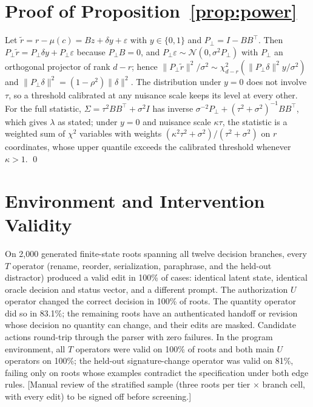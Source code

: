 \documentclass[10pt]{article}
\newcommand{\TBD}[1]{\textcolor{BrickRed}{[#1]}}
\begin{document}



\appendix
\section{Proof of Proposition~\ref{prop:power}}
\label{app:proof}
Let $\tilde r=r-\mu(c)=Bz+\delta y+\varepsilon$ with $y\in\{0,1\}$ and $P_\perp=I-BB^\top$. Then
$P_\perp\tilde r=P_\perp\delta y+P_\perp\varepsilon$ because $P_\perp B=0$, and $P_\perp\varepsilon\sim
\mathcal N(0,\sigma^2P_\perp)$ with $P_\perp$ an orthogonal projector of rank $d-r$; hence
$\lVert P_\perp\tilde r\rVert^2/\sigma^2\sim\chi^2_{d-r}(\lVert P_\perp\delta\rVert^2 y/\sigma^2)$ and
$\lVert P_\perp\delta\rVert^2=(1-\rho^2)\lVert\delta\rVert^2$. The distribution under $y=0$ does not
involve $\tau$, so a threshold calibrated at any nuisance scale keeps its level at every other. For the
full statistic, $\Sigma=\tau^2BB^\top+\sigma^2I$ has inverse $\sigma^{-2}P_\perp+(\tau^2+\sigma^2)^{-1}BB^\top$,
which gives $\lambda$ as stated; under $y=0$ and nuisance scale $\kappa\tau$, the statistic is a weighted
sum of $\chi^2$ variables with weights $(\kappa^2\tau^2+\sigma^2)/(\tau^2+\sigma^2)$ on $r$ coordinates,
whose upper quantile exceeds the calibrated threshold whenever $\kappa>1$. \qed

\section{Environment and Intervention Validity}
\label{app:validity}
On 2{,}000 generated finite-state roots spanning all twelve decision branches, every $T$ operator
(rename, reorder, serialization, paraphrase, and the held-out distractor) produced a valid edit in
100\% of cases: identical latent state, identical oracle decision and status vector, and a different
prompt. The authorization $U$ operator changed the correct decision in 100\% of roots. The quantity
operator did so in 83.1\%; the remaining roots have an authenticated handoff or revision whose decision
no quantity can change, and their edits are masked. Candidate actions round-trip through the parser
with zero failures. In the program environment, all $T$ operators were valid on 100\% of roots and both
main $U$ operators on 100\%; the held-out signature-change operator was valid on 81\%, failing only on
roots whose examples contradict the specification under both edge rules. \TBD{Manual review of the
stratified sample (three roots per tier $\times$ branch cell, with every edit) to be signed off before
screening.}
\end{document}
